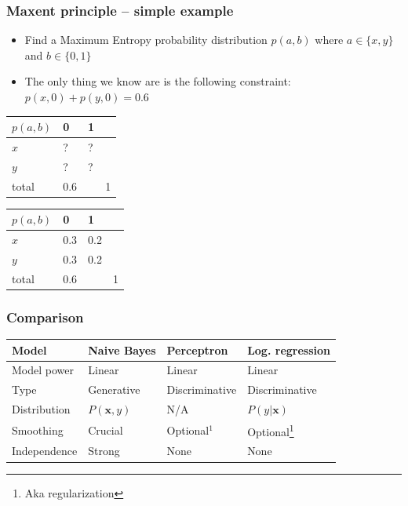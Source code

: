 \documentclass[14pt,mathserif,dvipsnames,usenames]{beamer}
\newcommand{\x}{\mathbf{x}}
\begin{document}
\begin{frame}
 \frametitle{Maxent principle -- simple example}
\begin{itemize}
\item Find a Maximum Entropy probability distribution $p(a,b)$ where
  $a \in \{x,y\}$ and $b \in \{0,1\}$
\item The only thing we know are is the following constraint: 
  $p(x,0) + p(y,0) = 0.6$
 \end{itemize}
 \begin{center}
   
\begin{tabular}{l|ll|l}
 $p(a,b)$ & 0 & 1 & \\\hline
$x$       & ? & ? & \\
$y$       & ? & ? & \\\hline 
total     & 0.6 & & 1
\end{tabular}
\end{center}
\pause 
\begin{center}

\begin{tabular}{l|ll|l}
 $p(a,b)$ & 0 & 1 & \\\hline
$x$       & 0.3 & 0.2 & \\
$y$       & 0.3 & 0.2 & \\\hline
total     & 0.6 & & 1
\end{tabular}
\end{center}
\end{frame}


\begin{frame}
  \frametitle{Comparison}
  \begin{center}
    \begin{small}
      \begin{tabular}{l||l|l|l}
        Model          & Naive Bayes & Perceptron     & Log. regression \\\hline
        Model power    & Linear      & Linear         & Linear         \\
        Type           & Generative  & Discriminative & Discriminative \\
        Distribution   & $P(\x,y)$   & N/A            & $P(y|\x)$         \\
        Smoothing      & Crucial     & Optional$^1$   &
        Optional\footnote{Aka regularization} \\
        Independence & Strong      & None           & None\\
      \end{tabular}
    \end{small}
  \end{center}
\end{frame}
\end{document}
